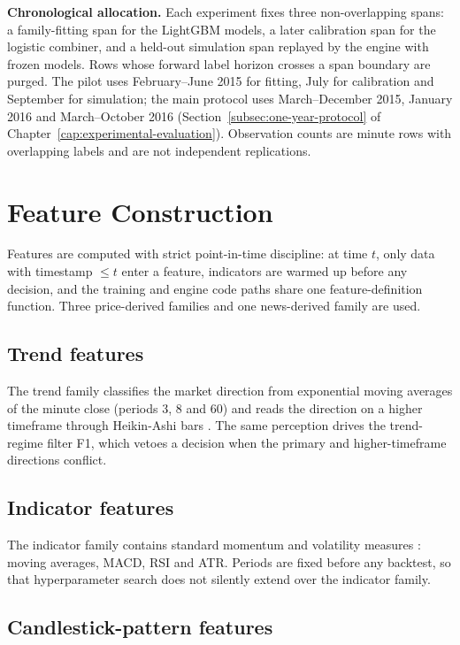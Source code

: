 \textbf{Chronological allocation.} Each experiment fixes three non-overlapping spans: a family-fitting span for the LightGBM models, a later calibration span for the logistic combiner, and a held-out simulation span replayed by the engine with frozen models. Rows whose forward label horizon crosses a span boundary are purged. The pilot uses February--June 2015 for fitting, July for calibration and September for simulation; the main protocol uses March--December 2015, January 2016 and March--October 2016 (Section~\ref{subsec:one-year-protocol} of Chapter~\ref{cap:experimental-evaluation}). Observation counts are minute rows with overlapping labels and are not independent replications.

\section{Feature Construction} \label{sec:feature-layer}

Features are computed with strict point-in-time discipline: at time $t$, only data with timestamp $\leq t$ enter a feature, indicators are warmed up before any decision, and the training and engine code paths share one feature-definition function. Three price-derived families and one news-derived family are used.

\subsection{Trend features} \label{subsec:ta-structural-features}

The trend family classifies the market direction from exponential moving averages of the minute close (periods 3, 8 and 60) and reads the direction on a higher timeframe through Heikin-Ashi bars \cite{valcu2004heikinashi}. The same perception drives the trend-regime filter F1, which vetoes a decision when the primary and higher-timeframe directions conflict.

\subsection{Indicator features} \label{subsec:indicator-features}

The indicator family contains standard momentum and volatility measures \cite{murphy1999technical}: moving averages, MACD, RSI and ATR. Periods are fixed before any backtest, so that hyperparameter search does not silently extend over the indicator family.

\subsection{Candlestick-pattern features} \label{subsec:pattern-features}

